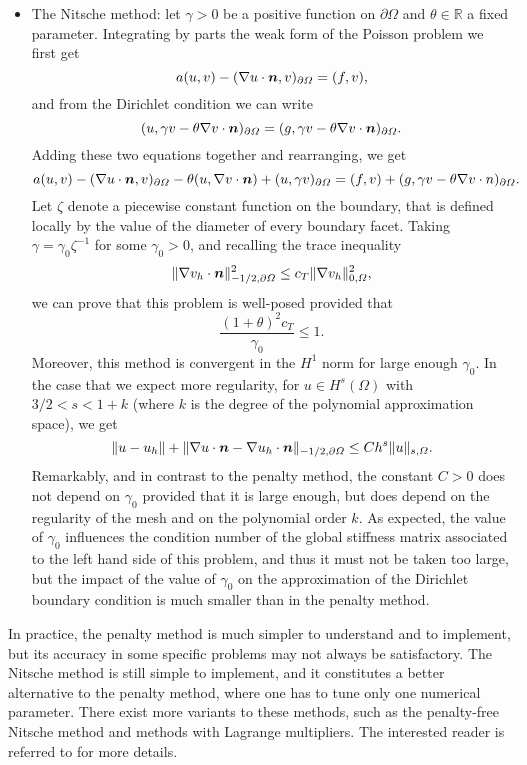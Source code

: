 \documentclass{article}
\renewcommand{\vec}{\vectorsym}
\begin{document}
\begin{itemize}
\item The Nitsche method: let $\gamma > 0$ be a positive function on $\partial\Omega$ and $\theta\in\mathbb{R}$ a fixed parameter. Integrating by parts the weak form of the Poisson problem we first get 
$$a(u,v) - (\nabla u\cdot \vec n, v)_{\partial\Omega} = (f,v),$$
and from the Dirichlet condition we can write 
$$(u,\gamma v -\theta\nabla v\cdot \vec n)_{\partial\Omega} = (g,\gamma v - \theta \nabla v \cdot \vec n)_{\partial\Omega}.$$
Adding these two equations together and rearranging, we get 
$$a(u,v) - (\nabla u \cdot \vec n, v)_{\partial\Omega} - \theta (u,\nabla v\cdot  \vec n) + (u,\gamma v)_{\partial\Omega} = (f,v) + (g,\gamma v - \theta \nabla v\cdot n)_{\partial\Omega}.$$
Let $\zeta$ denote a piecewise constant function on the boundary, that is defined locally by the value of the diameter of every boundary facet. Taking $\gamma = \gamma_0 \zeta^{-1}$ for some $\gamma_0>0$, and recalling the trace inequality 
$$\|\nabla v_h\cdot \vec n\|^2_{-1/2,\partial\Omega} \leq c_T \|\nabla v_h\|^2_{0,\Omega},$$
we can prove that this problem is well-posed provided that 
$$\frac{(1+\theta)^2 c_T}{\gamma_0}\leq 1.$$
Moreover, this method is convergent in the $H^1$ norm for large enough $\gamma_0$. In the case that we expect more regularity, for $u\in H^s(\Omega)$ with $3/2<s<1+k$ (where $k$ is the degree of the polynomial approximation space), we get
$$\|u-u_h\| + \|\nabla u\cdot \vec n - \nabla u_h\cdot \vec n\|_{-1/2,\partial\Omega} \leq Ch^s\|u\|_{s,\Omega}.$$
Remarkably, and in contrast to the penalty method, the constant $C>0$ does not depend on $\gamma_0$ provided that it is large enough, but does depend on the regularity of the mesh and on the polynomial order $k$. As expected, the value of $\gamma_0$ influences the condition number of the global stiffness matrix associated to the left hand side of this problem, and thus it must not be taken too large, but the impact of the value of $\gamma_0$ on the approximation of the Dirichlet boundary condition is much smaller than in the penalty method. 
\end{itemize}

In practice, the penalty method is much simpler to understand and to implement, but its accuracy in some specific problems may not always be satisfactory. The Nitsche method is still simple to implement, and it constitutes a better alternative to the penalty method, where one has to tune only one numerical parameter. There exist more variants to these methods, such as the penalty-free Nitsche method and methods with Lagrange multipliers. The interested reader is referred to \cite{Chouly2024} for more details.
\end{document}
